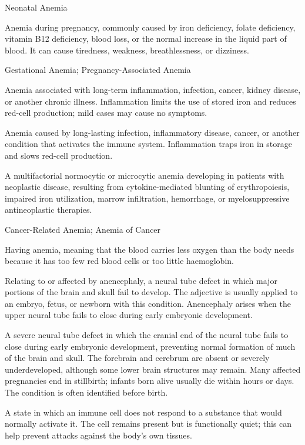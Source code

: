 \synonyms
Neonatal Anemia

 Anemia during pregnancy, commonly caused by iron deficiency, folate deficiency, vitamin B12 deficiency, blood loss, or the normal increase in the liquid part of blood. It can cause tiredness, weakness, breathlessness, or dizziness.

\synonyms
Gestational Anemia; Pregnancy-Associated Anemia

 Anemia associated with long-term inflammation, infection, cancer, kidney disease, or another chronic illness. Inflammation limits the use of stored iron and reduces red-cell production; mild cases may cause no symptoms.

 Anemia caused by long-lasting infection, inflammatory disease, cancer, or another condition that activates the immune system. Inflammation traps iron in storage and slows red-cell production.

 A multifactorial normocytic or microcytic anemia developing in patients with neoplastic disease, resulting from cytokine-mediated blunting of erythropoiesis, impaired iron utilization, marrow infiltration, hemorrhage, or myelosuppressive antineoplastic therapies.

\synonyms
Cancer-Related Anemia; Anemia of Cancer

 Having anemia, meaning that the blood carries less oxygen than the body needs because it has too few red blood cells or too little haemoglobin.

 Relating to or affected by anencephaly, a neural tube defect in which major portions of the
brain and skull fail to develop. The adjective is usually applied to an embryo, fetus, or newborn
with this condition. Anencephaly arises when the upper neural tube fails to close during early
embryonic development.

 A severe neural tube defect in which the cranial end of the neural tube fails to close during early
embryonic development, preventing normal formation of much of the brain and skull. The forebrain and cerebrum are absent
or severely underdeveloped, although some lower brain structures may remain. Many affected pregnancies end in stillbirth;
infants born alive usually die within hours or days. The condition is often identified before birth.

 A state in which an immune cell does not respond to a substance that would normally activate it. The cell remains present but is functionally quiet; this can help prevent attacks against the body’s own tissues.

